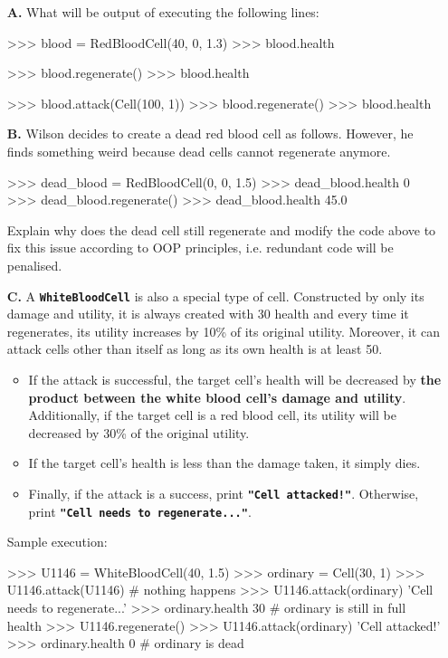 \begin{enumerate}
\item[\textbf{A.}]
What will be output of executing the following lines:
\begin{python}
>>> blood = RedBloodCell(40, 0, 1.3)
>>> blood.health

>>> blood.regenerate()
>>> blood.health

>>> blood.attack(Cell(100, 1))
>>> blood.regenerate()
>>> blood.health
\end{python}
\begin{flushright}
    [2 marks]
\end{flushright}

\item[\textbf{B.}]
Wilson decides to create a dead red blood cell as follows. However, he finds something weird because dead cells cannot regenerate anymore.
\begin{python}
>>> dead_blood = RedBloodCell(0, 0, 1.5)
>>> dead_blood.health
0
>>> dead_blood.regenerate()
>>> dead_blood.health
45.0
\end{python}
Explain why does the dead cell still regenerate and modify the code above to fix this issue according to OOP principles, i.e. 
redundant code will be penalised.
\begin{flushright}
    [4 marks]
\end{flushright}

\item[\textbf{C.}]
A \colorbox{CornflowerBlue!20}{\texttt{\textbf{WhiteBloodCell}}} is also a special type of cell. Constructed by only its damage and utility, it is always created 
with 30 health and every time it regenerates, its utility increases by 10\% of its original utility. Moreover, it can attack cells other than itself as long as 
its own health is at least 50.
\begin{itemize}
\item If the attack is successful, the target cell's health will be decreased by \textbf{the product between the white blood cell's damage and utility}. Additionally, 
if the target cell is a red blood cell, its utility will be decreased by 30\% of the original utility.
\item If the target cell's health is less than the damage taken, it simply dies.
\item Finally, if the attack is a success, print \texttt{\bfseries "Cell attacked!"}. Otherwise, print \texttt{\bfseries "Cell needs to regenerate..."}.
\end{itemize}
Sample execution:
\begin{python}
>>> U1146 = WhiteBloodCell(40, 1.5)
>>> ordinary = Cell(30, 1)
>>> U1146.attack(U1146)     # nothing happens
>>> U1146.attack(ordinary)
'Cell needs to regenerate...'
>>> ordinary.health
30                          # ordinary is still in full health
>>> U1146.regenerate()
>>> U1146.attack(ordinary)
'Cell attacked!'
>>> ordinary.health
0                           # ordinary is dead


\end{python}
\end{enumerate}
